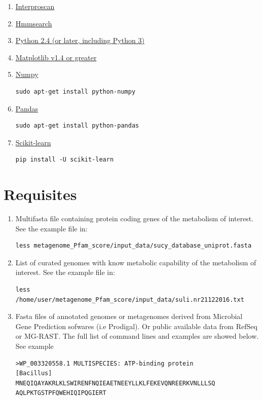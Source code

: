 \documentclass[12pt]{report}
\begin{document}
\begin{enumerate}
\item{\href{https://www.ebi.ac.uk/interpro/interproscan.htm}{Interproscan}}
\item{ \href{http://hmmer.org/}{Hmmsearch}}

\item{\href{https://www.python.org/downloads/}{Python 2.4 (or later, including
Python 3)
    }}

\item{\href{http://matplotlib.org/users/installing.html#most-platforms-
scientific-python-distributions}{Matplotlib v1.4 or greater}}

\item{\href{https://docs.scipy.org
/doc/numpy-1.10.0/user/install.html}{Numpy}}
\begin{verbatim}
sudo apt-get install python-numpy 
\end{verbatim}
\item{\href{http://pandas.pydata.org
/pandas-docs/stable/install.html}{Pandas}}
\begin{verbatim}
sudo apt-get install python-pandas 
\end{verbatim}
\item{\href{http://scikit-learn.org/stable/install.html}{Scikit-learn}}
\begin{verbatim}
pip install -U scikit-learn
\end{verbatim}
\end{enumerate}

\section{Requisites}
\begin{enumerate}

\item Multifasta file containing protein coding genes of the metabolism of
interest. See the example file in: 
\begin{verbatim}
less metagenome_Pfam_score/input_data/sucy_database_uniprot.fasta
\end{verbatim}

\item List of curated genomes with know metabolic capability of the metabolism
of interest.  See the example file in: 
\begin{verbatim}
less /home/user/metagenome_Pfam_score/input_data/suli.nr21122016.txt
\end{verbatim}

\item Fasta files of annotated genomes or metagenomes derived from Microbial
Gene Prediction sofwares (i.e Prodigal). Or public available data from RefSeq
or MG-RAST. The full list of command lines and examples are showed below. See
example
\begin{verbatim}
>WP_003320558.1 MULTISPECIES: ATP-binding protein 
[Bacillus]
MNEQIQAYAKRLKLSWIRENFNQIEAETNEEYLLKLFEKEVQNREERKVNLLLSQ
AQLPKTGSTPFQWEHIQIPQGIERT
\end{verbatim}
\end{enumerate}
\end{document}
